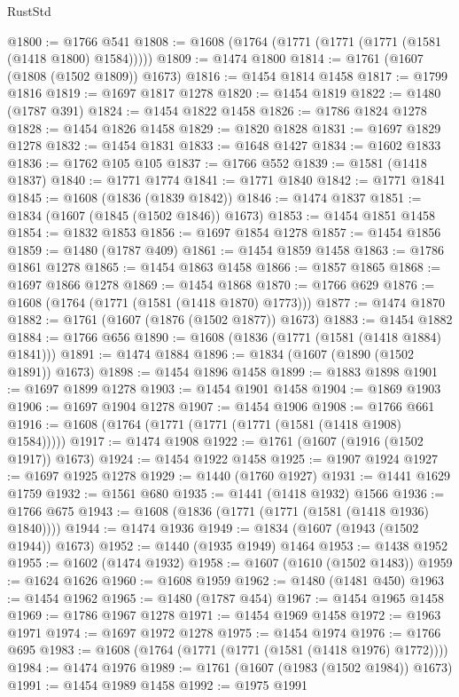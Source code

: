 \begin{lexlean}{RustStd}
\begin{coremodule}
@1800 := @1766 @541
@1808 := @1608 (@1764 (@1771 (@1771 (@1771 (@1581 (@1418 @1800) @1584)))))
@1809 := @1474 @1800
@1814 := @1761 (@1607 (@1808 (@1502 @1809)) @1673)
@1816 := @1454 @1814 @1458
@1817 := @1799 @1816
@1819 := @1697 @1817 @1278
@1820 := @1454 @1819
@1822 := @1480 (@1787 @391)
@1824 := @1454 @1822 @1458
@1826 := @1786 @1824 @1278
@1828 := @1454 @1826 @1458
@1829 := @1820 @1828
@1831 := @1697 @1829 @1278
@1832 := @1454 @1831
@1833 := @1648 @1427
@1834 := @1602 @1833
@1836 := @1762 @105 @105
@1837 := @1766 @552
@1839 := @1581 (@1418 @1837)
@1840 := @1771 @1774
@1841 := @1771 @1840
@1842 := @1771 @1841
@1845 := @1608 (@1836 (@1839 @1842))
@1846 := @1474 @1837
@1851 := @1834 (@1607 (@1845 (@1502 @1846)) @1673)
@1853 := @1454 @1851 @1458
@1854 := @1832 @1853
@1856 := @1697 @1854 @1278
@1857 := @1454 @1856
@1859 := @1480 (@1787 @409)
@1861 := @1454 @1859 @1458
@1863 := @1786 @1861 @1278
@1865 := @1454 @1863 @1458
@1866 := @1857 @1865
@1868 := @1697 @1866 @1278
@1869 := @1454 @1868
@1870 := @1766 @629
@1876 := @1608 (@1764 (@1771 (@1581 (@1418 @1870) @1773)))
@1877 := @1474 @1870
@1882 := @1761 (@1607 (@1876 (@1502 @1877)) @1673)
@1883 := @1454 @1882
@1884 := @1766 @656
@1890 := @1608 (@1836 (@1771 (@1581 (@1418 @1884) @1841)))
@1891 := @1474 @1884
@1896 := @1834 (@1607 (@1890 (@1502 @1891)) @1673)
@1898 := @1454 @1896 @1458
@1899 := @1883 @1898
@1901 := @1697 @1899 @1278
@1903 := @1454 @1901 @1458
@1904 := @1869 @1903
@1906 := @1697 @1904 @1278
@1907 := @1454 @1906
@1908 := @1766 @661
@1916 := @1608 (@1764 (@1771 (@1771 (@1771 (@1581 (@1418 @1908) @1584)))))
@1917 := @1474 @1908
@1922 := @1761 (@1607 (@1916 (@1502 @1917)) @1673)
@1924 := @1454 @1922 @1458
@1925 := @1907 @1924
@1927 := @1697 @1925 @1278
@1929 := @1440 (@1760 @1927)
@1931 := @1441 @1629 @1759
@1932 := @1561 @680
@1935 := @1441 (@1418 @1932) @1566
@1936 := @1766 @675
@1943 := @1608 (@1836 (@1771 (@1771 (@1581 (@1418 @1936) @1840))))
@1944 := @1474 @1936
@1949 := @1834 (@1607 (@1943 (@1502 @1944)) @1673)
@1952 := @1440 (@1935 @1949) @1464
@1953 := @1438 @1952
@1955 := @1602 (@1474 @1932)
@1958 := @1607 (@1610 (@1502 @1483))
@1959 := @1624 @1626
@1960 := @1608 @1959
@1962 := @1480 (@1481 @450)
@1963 := @1454 @1962
@1965 := @1480 (@1787 @454)
@1967 := @1454 @1965 @1458
@1969 := @1786 @1967 @1278
@1971 := @1454 @1969 @1458
@1972 := @1963 @1971
@1974 := @1697 @1972 @1278
@1975 := @1454 @1974
@1976 := @1766 @695
@1983 := @1608 (@1764 (@1771 (@1771 (@1581 (@1418 @1976) @1772))))
@1984 := @1474 @1976
@1989 := @1761 (@1607 (@1983 (@1502 @1984)) @1673)
@1991 := @1454 @1989 @1458
@1992 := @1975 @1991

\end{coremodule}
\end{lexlean}

